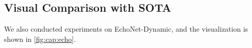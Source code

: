 \subsection{Visual Comparison with SOTA}
We also conducted experiments on EchoNet-Dynamic, and the visualization is shown in \cref{fig:cap:echo}.